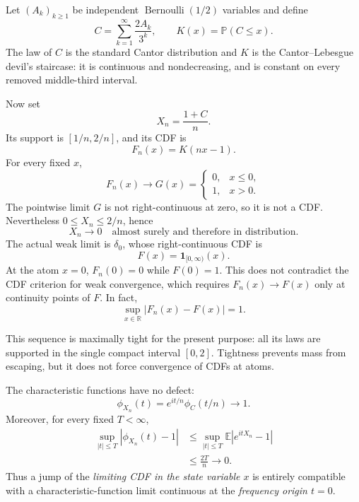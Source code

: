 \documentclass[10pt,a4paper]{article}
\numberwithin{equation}{section}
\theoremstyle{blueplain}
\theoremstyle{definition}
\newcommand{\E}{\mathbb E}
\newcommand{\Pp}{\mathbb P}
\newcommand{\R}{\mathbb R}
\newcommand{\ind}{\mathbf 1}
\begin{document}
Let \((A_k)_{k\ge1}\) be independent
\(\operatorname{Bernoulli}(1/2)\) variables and define
\begin{equation}
  C=\sum_{k=1}^{\infty}\frac{2A_k}{3^k},
  \qquad
  K(x)=\Pp(C\le x).
  \label{eq:cantor-variable}
\end{equation}
The law of \(C\) is the standard Cantor distribution and \(K\) is the
Cantor--Lebesgue devil's staircase: it is continuous and nondecreasing, and is
constant on every removed middle-third interval.

Now set
\begin{equation}
  X_n=\frac{1+C}{n}.
  \label{eq:compressed-cantor}
\end{equation}
Its support is \([1/n,2/n]\), and its CDF is
\[
  F_n(x)=K(nx-1).
\]
For every fixed \(x\),
\begin{equation}
  F_n(x)\longrightarrow
  G(x)=
  \begin{cases}
    0,&x\le0,\\
    1,&x>0.
  \end{cases}
  \label{eq:compressed-cdf-pointwise}
\end{equation}
The pointwise limit \(G\) is not right-continuous at zero, so it is not a
CDF.  Nevertheless \(0\le X_n\le2/n\), hence
\[
  X_n\longrightarrow0
  \quad\text{almost surely and therefore in distribution}.
\]
The actual weak limit is \(\delta_0\), whose right-continuous CDF is
\[
  F(x)=\ind_{[0,\infty)}(x).
\]
At the atom \(x=0\), \(F_n(0)=0\) while \(F(0)=1\).  This does not contradict
the CDF criterion for weak convergence, which requires \(F_n(x)\to F(x)\)
only at continuity points of \(F\).  In fact,
\begin{equation}
  \sup_{x\in\R}|F_n(x)-F(x)|=1.
  \label{eq:cantor-cdf-not-uniform}
\end{equation}

This sequence is maximally tight for the present purpose: all its laws are
supported in the single compact interval \([0,2]\).  Tightness prevents mass
from escaping, but it does not force convergence of CDFs at atoms.

The characteristic functions have no defect:
\begin{equation}
  \phi_{X_n}(t)=e^{it/n}\phi_C(t/n)\longrightarrow1.
  \label{eq:compressed-cantor-cf}
\end{equation}
Moreover, for every fixed \(T<\infty\),
\begin{align}
  \sup_{|t|\le T}|\phi_{X_n}(t)-1|
  &\le
  \sup_{|t|\le T}\E|e^{itX_n}-1|\\
  &\le \frac{2T}{n}\longrightarrow0.
  \label{eq:compressed-cantor-local-uniform}
\end{align}
Thus a jump of the \emph{limiting CDF in the state variable \(x\)} is entirely
compatible with a characteristic-function limit continuous at the
\emph{frequency origin \(t=0\)}.
\end{document}
